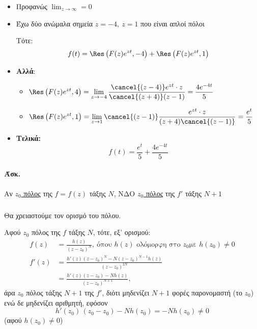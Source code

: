 \documentclass[12pt,a4paper,notitlepage,fleqn]{article}
\begin{document}
    \begin{itemize}
    	\item Προφανώς \( \displaystyle \lim_{z\to \infty} = 0 \)
    	\item Έχω δύο ανώμαλα σημεία \( z=-4,\ z=1 \) που είναι απλοί πόλοι
    	
    	Τότε:
    	\[
    	f(t) = \Res\left(F(z)e^{zt},-4\right) + \Res\left(F(z)e^{zt},1\right)
    	\]
    	
    	\item \textbf{Αλλά}:
    	\begin{itemize}
    		\item \( 
    		\displaystyle
    		\Res\left(F(z)e^{zt},4\right) =
    		\lim_{z\to -4} \frac{\cancel{(z-4)}e^{zt}\cdot z}{\cancel{(z+4)}(z-1)}
    		= \frac{4e^{-4t}}{5}
    		 \)
    		\item \( 
    		\displaystyle
    		\Res\left(F(z)e^{zt},1\right) =
    		\lim_{z\to 1} \cancel{(z-1)} \frac{e^{zt}\cdot z}{(z+4)\cancel{(z-1)}}
    		= \frac{e^t}{5}
    		\)
    	\end{itemize}
    	\item \textbf{Τελικά:}
    	\[
    	f(t) = \frac{e^t}{5} + \frac{4e^{-4t}}{5}
    	\]
    \end{itemize}
    
    \paragraph{Άσκ.}
    Αν \underline{\( z_0 \) πόλος} της \( f=f(z) \) τάξης \( N \),
    ΝΔΟ \underline{\( z_0 \) πόλος} της \( f' \) τάξης \( N+1 \)

    \subparagraph{}
    \begin{attnbox}{}
    	Θα χρειαστούμε τον ορισμό του πόλου.
    \end{attnbox}
    Αφού \( z_0 \) πόλος της \( f \) τάξης \( N \), τότε,
    εξ' ορισμού:
    \begin{align*}
    	f(z) &= \frac{h(z)}{(z-z_0)^N}, \ \text{όπου $h(z)$ ολόμορφη στο $z_0$
    		με $h(z_0) \neq 0$} \\
    	f'(z) &= \frac{h'(z)(z-z_0)^N-N(z-z_0)^{N-1}h(z)}{(z-z_0)^{2N}}
    	\\ &= \frac{h'(z)(z-z_0) - Nh(z)}{(z-z_0)^{N+1}},
    \end{align*}
    άρα \( z_0 \) πόλος τάξης \( N+1 \) της \( f' \), διότι μηδενίζει \( N+1 \) φορές
    παρονομαστή (το \( z_0 \)) ενώ δε μηδενίζει αριθμητή, εφόσον
    \[
    h'(z_0)\, (z_0-z_0) - Nh(z_0) = -Nh(z_0) \neq 0
    \]
    (αφού \( h(z_0) \neq 0 \))
    
\end{document}
